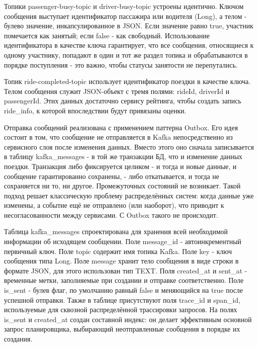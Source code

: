 {  \par \redline Топики passenger-busy-topic и driver-busy-topic устроены идентично. Ключом сообщения выступает идентификатор пассажира или водителя (Long), а телом - булево значение, инкапсулированное в JSON. Если значение равно true, участник помечается как занятый; если false - как свободный. Использование идентификатора в качестве ключа гарантирует, что все сообщения, относящиеся к одному участнику, попадают в один и тот же раздел топика и обрабатываются в порядке поступления - это важно, чтобы статусы занятости не перепутались.

  \par \redline Топик ride-completed-topic использует идентификатор поездки в качестве ключа. Телом сообщения служит JSON-объект с тремя полями: rideId, driverId и passengerId. Этих данных достаточно сервису рейтинга, чтобы создать запись ride\_info, к которой впоследствии будут привязаны оценки.

  \par \redline Отправка сообщений реализована с применением паттерна Outbox. Его идея состоит в том, что сообщение не отправляется в Kafka непосредственно из сервисного слоя после изменения данных. Вместо этого оно сначала записывается в таблицу kafka\_messages - в той же транзакции БД, что и изменение данных поездки. Транзакция либо фиксируется целиком - и тогда и новые данные, и сообщение гарантированно сохранены, - либо откатывается, и тогда не сохраняется ни то, ни другое. Промежуточных состояний не возникает. Такой подход решает классическую проблему распределённых систем: когда данные уже изменены, а событие ещё не отправлено (или наоборот), что приводит к несогласованности между сервисами. С Outbox такого не происходит.

  \par \redline Таблица kafka\_messages спроектирована для хранения всей необходимой информации об исходящем сообщении. Поле message\_id - автоинкрементный первичный ключ. Поле topic содержит имя топика Kafka. Поле key - ключ сообщения типа Long. Поле message хранит тело сообщения в виде строки в формате JSON, для этого использован тип TEXT. Поля created\_at и sent\_at - временные метки, заполняемые при создании и отправке соответственно. Поле is\_sent - булев флаг, по умолчанию равный false и меняющийся на true после успешной отправки. Также в таблице присутствуют поля trace\_id и span\_id, используемые для сквозной распределённой трассировки запросов. На полях is\_sent и created\_at создан составной индекс: он делает эффективным основной запрос планировщика, выбирающий неотправленные сообщения в порядке их создания.

}
